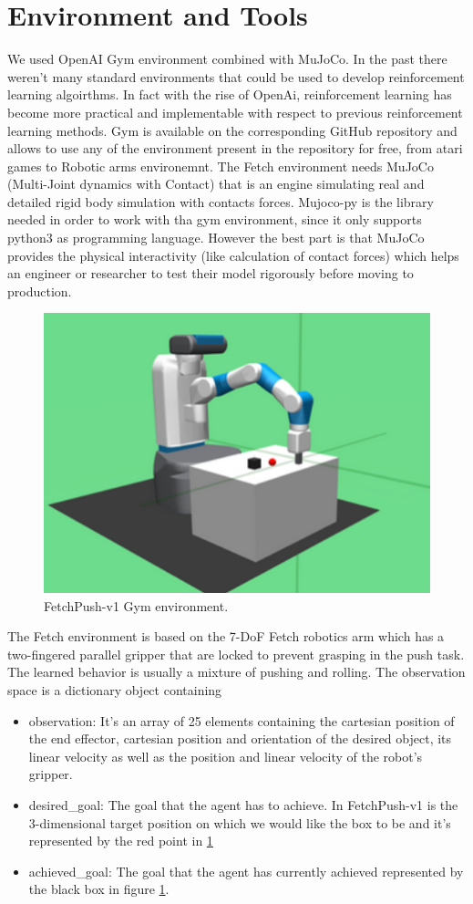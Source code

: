\documentclass[a4paper]{report}
\begin{document}
\section{Environment and Tools}
We used OpenAI Gym environment combined with MuJoCo. In the past there weren't many standard environments that could be used to develop reinforcement learning algoirthms. In fact with the rise of OpenAi, reinforcement learning has become more practical and implementable with respect to previous  reinforcement learning methods. Gym is available on the corresponding GitHub repository and allows to use any of the environment present in the repository for free, from atari games to Robotic arms environemnt. The Fetch environment needs MuJoCo (Multi-Joint dynamics with Contact) that is an engine simulating real and detailed rigid body simulation with contacts forces. Mujoco-py is the library needed in order to work with tha gym environment, since it only supports python3 as programming language. However the best part is that MuJoCo provides the physical interactivity (like calculation of contact forces) which helps an engineer or researcher to test their model rigorously before moving to production.
\begin{figure}[h!]
\centering
\includegraphics[scale=0.9]{fetchpush.png}
\caption{\label{Fig: fetchpush} FetchPush-v1 Gym environment.}
\end{figure}

The Fetch environment is based on the 7-DoF Fetch robotics arm which has a two-fingered parallel gripper that are locked to prevent grasping in the push task. The learned behavior is usually a mixture of pushing and rolling. The observation space is a dictionary object containing  
\begin{itemize}
\item observation: It's an array of 25 elements containing the cartesian position of the end effector, cartesian position and orientation of the desired object, its linear velocity as well as the position and linear velocity of the robot's gripper.
\item desired\_goal: The goal that the agent has to achieve. In FetchPush-v1 is the 3-dimensional target position on which we would like the box to be and it's represented by the red point in \ref{Fig: fetchpush}
\item achieved\_goal: The goal that the agent has currently achieved represented by the black box in figure \ref{Fig: fetchpush}.
\end{itemize}
\end{document}
